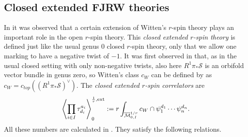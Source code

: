 \documentclass[11pt]{amsart}
\theoremstyle{definition}
\theoremstyle{remark}
\newcommand{\<}{\left<}
\renewcommand{\>}{\right>}
\numberwithin{equation}{section}
\def\Mbar{{\overline{\mathcal M}}}
\begin{document}
\subsection{Closed extended FJRW theories}\label{subsec:closed_ext_r_m}
In \cite{BCT_Closed_Extended,BCT2} it %
was observed that a certain extension of Witten's $r$-spin theory plays an important role in the open $r$-spin theory. This \emph{closed extended $r$-spin theory} is defined just like the %
usual genus $0$ closed %
$r$-spin %
theory, only that we allow %
one marking to have a negative twist of $-1.$ It was first observed in \cite{JKV2} that, as in the usual closed setting with only non-negative %
twists, also here $R^1\pi_*\mathcal{S}$ %
is an orbifold vector bundle in genus zero, so Witten's class $c_W$ can be %
defined by as %
$c_W=c_{top}((R^1\pi_*\mathcal{S})^\vee)$. The \textit{closed extended $r$-spin correlators} %
are
\begin{equation}\label{eq:define closed ext}
\left\langle\prod_{i\in I}\tau^{a_i}_{d_i}\right\rangle^{\frac{1}{r},\text{ext}}_0:=r\int_{\Mbar^{1/r}_{0,I}} \hspace{-0cm} c_W \cap \psi_1^{d_1} \cdots \psi_n^{d_n}.
\end{equation}
 All these %
numbers are calculated in \cite{BCT_Closed_Extended}. They satisfy the following relations.
\end{document}

